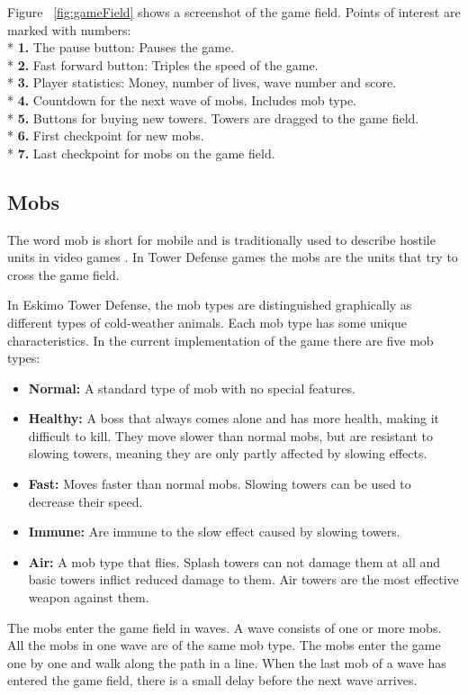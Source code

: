 \clearpage

Figure ~\ref{fig:gameField} shows a screenshot of the game field. Points of interest are marked with numbers: \\*
{\bf 1.} The pause button: Pauses the game. \\*
{\bf 2.} Fast forward button: Triples the speed of the game. \\*
{\bf 3.} Player statistics: Money, number of lives, wave number and score. \\*
{\bf 4.} Countdown for the next wave of mobs. Includes mob type. \\*
{\bf 5.} Buttons for buying new towers. Towers are dragged to the game field. \\*
{\bf 6.} First checkpoint for new mobs. \\*
{\bf 7.} Last checkpoint for mobs on the game field.

\subsection{Mobs}

The word mob is short for mobile and is traditionally used to describe hostile units in video games \citep{netGames}. In Tower Defense games the mobs are the units that try to cross the game field.

In Eskimo Tower Defense, the mob types are distinguished graphically as different types of cold-weather animals. Each mob type has some unique characteristics. In the current implementation of the game there are five mob types:

\begin{itemize}
\item {\bf Normal:} A standard type of mob with no special features.
\item {\bf Healthy:} A boss that always comes alone and has more health, making it difficult to kill. They move slower than normal mobs, but are resistant to slowing towers, meaning they are only partly affected by slowing effects.
\item {\bf Fast:} Moves faster than normal mobs. Slowing towers can be used to decrease their speed.
\item {\bf Immune:} Are immune to the slow effect caused by slowing towers.
\item {\bf Air:} A mob type that flies. Splash towers can not damage them at all and basic towers inflict reduced damage to them. Air towers are the most effective weapon against them.
\end{itemize}
The mobs enter the game field in waves. A wave consists of one or more mobs. All the mobs in one wave are of the same mob type. The mobs enter the game one by one and walk along the path in a line. When the last mob of a wave has entered the game field, there is a small delay before the next wave arrives.

